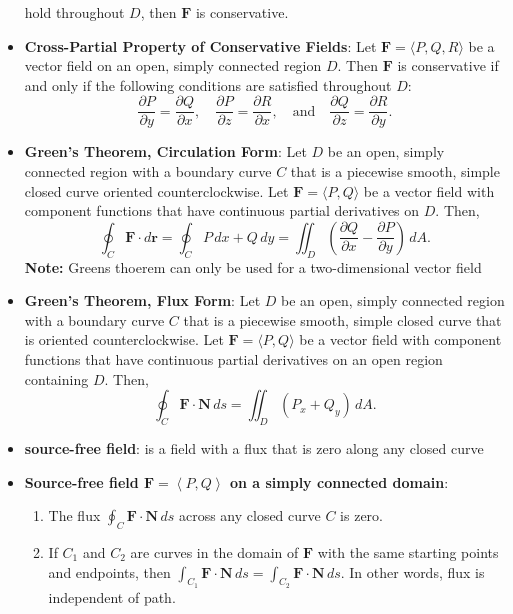 \documentclass{report}
\begin{document}
\begin{itemize}
\[            \]
            hold throughout \( D \), then \( \mathbf{F} \) is conservative.
        \item \textbf{Cross-Partial Property of Conservative Fields}:
            Let \( \mathbf{F} = \langle P, Q, R \rangle \) be a vector field on an open, simply connected region \( D \). Then \( \mathbf{F} \) is conservative if and only if the following conditions are satisfied throughout \( D \):
            \[
                \frac{\partial P}{\partial y} = \frac{\partial Q}{\partial x}, \quad \frac{\partial P}{\partial z} = \frac{\partial R}{\partial x}, \quad \text{and} \quad \frac{\partial Q}{\partial z} = \frac{\partial R}{\partial y}.
            \]
        \item \textbf{Green’s Theorem, Circulation Form}:
            Let \( D \) be an open, simply connected region with a boundary curve \( C \) that is a piecewise smooth, simple closed curve oriented counterclockwise. Let \( \mathbf{F} = \langle P, Q \rangle \) be a vector field with component functions that have continuous partial derivatives on \( D \). Then,
            \[
                \oint_C \mathbf{F} \cdot d\mathbf{r} = \oint_C P \, dx + Q \, dy = \iint_D \left( \frac{\partial Q}{\partial x} - \frac{\partial P}{\partial y} \right) \, dA.
            \]
            \bigbreak \noindent 
            \textbf{Note:} Greens thoerem can only be used for a two-dimensional vector field
        \item \textbf{Green’s Theorem, Flux Form}:
            Let \( D \) be an open, simply connected region with a boundary curve \( C \) that is a piecewise smooth, simple closed curve that is oriented counterclockwise. Let \( \mathbf{F} = \langle P, Q \rangle \) be a vector field with component functions that have continuous partial derivatives on an open region containing \( D \). Then,
            \[
                \oint_C \mathbf{F} \cdot \mathbf{N} \, ds = \iint_D \left( P_x + Q_y \right) \, dA.
            \]
        \item \textbf{source-free field}: is a field with a flux that is zero along any closed curve
        \item \textbf{Source-free field $\mathbf{F} =\left\langle P,Q \right\rangle$ on a simply connected domain}:
            \begin{enumerate}
                \item The flux \(\oint_C \mathbf{F} \cdot \mathbf{N} \, ds\) across any closed curve \( C \) is zero.
                \item If \( C_1 \) and \( C_2 \) are curves in the domain of \( \mathbf{F} \) with the same starting points and endpoints, then \(\int_{C_1} \mathbf{F} \cdot \mathbf{N} \, ds = \int_{C_2} \mathbf{F} \cdot \mathbf{N} \, ds\). In other words, flux is independent of path.

\end{enumerate}
\end{itemize}
\end{document}
